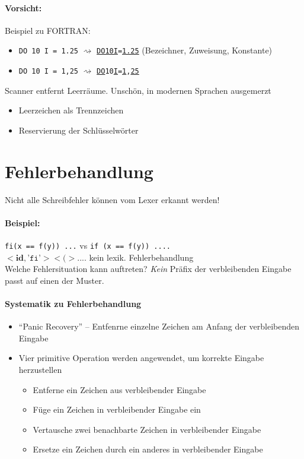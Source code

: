 \paragraph*{Vorsicht:} Beispiel zu FORTRAN:
\begin{itemize}
 \lstset{language=fortran}
 \item \lstinline!DO 10 I = 1.25! $\rightsquigarrow$ \underline{\lstinline!DO10I!}\lstinline!=!\underline{\lstinline!1.25!} (Bezeichner, Zuweisung, Konstante)
 \item \lstinline!DO 10 I = 1,25! $\rightsquigarrow$ \lstset{language=} \underline{\lstinline!DO!}\lstinline!10!\underline{\lstinline!I!}\lstinline!=!\underline{\lstinline!1!}\lstinline!,!\underline{\lstinline!25!}
\end{itemize}
Scanner entfernt Leerräume. Unschön, in modernen Sprachen ausgemerzt
\begin{itemize}
 \item Leerzeichen als Trennzeichen
 \item Reservierung der Schlüsselwörter
\end{itemize}

\section{Fehlerbehandlung}
Nicht alle Schreibfehler können vom Lexer erkannt werden!
\paragraph*{Beispiel:} \lstinline!fi(x == f(y)) ...! vs \lstinline!if (x == f(y)) ....! \\
$<\textbf{id}, \texttt{'fi'}><(> ....$ kein lexik. Fehlerbehandlung\\
Welche Fehlersituation kann auftreten? \emph{Kein} Präfix der verbleibenden Eingabe passt auf einen der Muster.
\paragraph{Systematik zu Fehlerbehandlung}
\begin{itemize}
 \item "`Panic Recovery"' -- Entfenrne einzelne Zeichen am Anfang der verbleibenden Eingabe
 \item Vier primitive Operation werden angewendet, um korrekte Eingabe herzustellen
     \begin{itemize}
     \item Entferne ein Zeichen aus verbleibender Eingabe
     \item Füge ein Zeichen in verbleibender Eingabe ein
     \item Vertausche zwei benachbarte Zeichen in verbleibender Eingabe
     \item Ersetze ein Zeichen durch ein anderes in verbleibender Eingabe
     \end{itemize}
\end{itemize}

